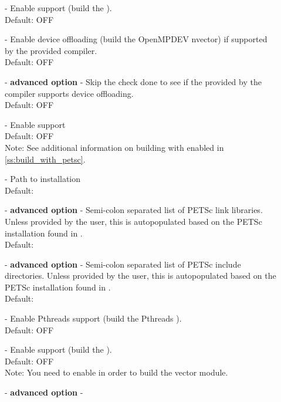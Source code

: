 \begin{description}
\item[] -
  Enable {\openmp} support (build the {\openmp} {\nvector}).
  \\
  Default: OFF
\item[] -
  Enable {\openmp} device offloading (build the OpenMPDEV nvector) if supported by
  the provided compiler.
  \\
  Default: OFF
\item[] - \textbf{advanced option} -
  Skip the check done to see if the {\openmp} provided by the compiler
  supports {\openmp} device offloading.
  \\
  Default: OFF
\item[] -
  Enable {\petsc} support
  \\
  Default: OFF
  \\
  Note: See additional information on building with {\petsc} enabled
  in \ref{ss:build_with_petsc}.
\item[] -
  Path to {\petsc} installation
  \\
  Default:
\item[] - \textbf{advanced option} -
  Semi-colon separated list of PETSc link libraries. Unless provided by the
  user, this is autopopulated based on the PETSc installation found in
  .
  \\
  Default:
\item[] - \textbf{advanced option} -
  Semi-colon separated list of PETSc include directories. Unless provided by the
  user, this is autopopulated based on the PETSc installation found in
  .
  \\
  Default:
\item[] -
  Enable Pthreads support (build the Pthreads {\nvector}).
  \\
  Default: OFF
\item[] -
  Enable {\raja} support (build the {\raja} {\nvector}).
  \\
  Default: OFF
  \\
  Note: You need to enable {\cuda} in order to build the {\raja} vector module.
\item[] - \textbf{advanced option} -

\end{description}
